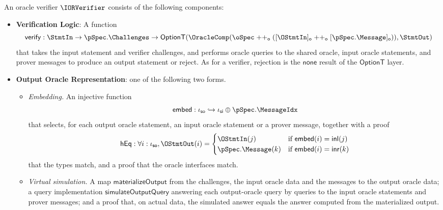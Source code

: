 \begin{definition}
    \label{def:oracle_verifier}
    An oracle verifier \(\IORVerifier\) consists of the following components:

    \begin{itemize}
        \item \textbf{Verification Logic}: A function
        \begin{equation*} \mathsf{verify} : \StmtIn \to \pSpec.\Challenges \to \mathsf{OptionT}(\OracleComp(\oSpec \mathrel{++_\mathsf{o}} ([\OStmtIn]_\mathsf{o} \mathrel{++_\mathsf{o}} [\pSpec.\Message]_\mathsf{o})), \StmtOut) \end{equation*}
        that takes the input statement and verifier challenges, and performs oracle queries to the shared oracle, input oracle statements, and prover messages to produce an output statement or reject. As for a verifier, rejection is the \(\mathsf{none}\) result of the \(\mathsf{OptionT}\) layer.

        \item \textbf{Output Oracle Representation}: one of the following two forms.
        \begin{itemize}
            \item \emph{Embedding.} An injective function
            \begin{equation*} \mathsf{embed} : \iota_{\mathsf{so}} \hookrightarrow \iota_{\mathsf{si}} \oplus \pSpec.\MessageIdx \end{equation*}
            that selects, for each output oracle statement, an input oracle statement or a prover
            message, together with a proof
            \begin{equation*} \mathsf{hEq} : \forall i : \iota_{\mathsf{so}}, \OStmtOut(i) = \begin{cases}
                \OStmtIn(j) & \text{if } \mathsf{embed}(i) = \mathsf{inl}(j) \\
                \pSpec.\Message(k) & \text{if } \mathsf{embed}(i) = \mathsf{inr}(k)
            \end{cases} \end{equation*}
            that the types match, and a proof that the oracle interfaces match.
            \item \emph{Virtual simulation.} A map \(\mathsf{materializeOutput}\) from the
            challenges, the input oracle data and the messages to the output oracle data; a query
            implementation \(\mathsf{simulateOutputQuery}\) answering each output-oracle query by
            queries to the input oracle statements and prover messages; and a proof that, on actual
            data, the simulated answer equals the answer computed from the materialized output.
        \end{itemize}
    \end{itemize}
    \leanok
\end{definition}

